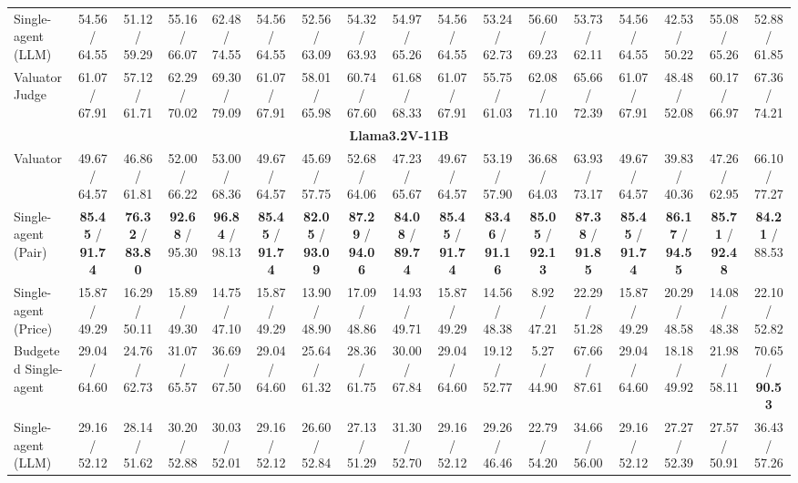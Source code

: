 \begin{table}[!t]
{\begin{tabular}{lcccccccccccccccc}
Single-agent (LLM)           & 54.56 / 64.55 & 51.12 / 59.29 & 55.16 / 66.07 & 62.48 / 74.55 & 54.56 / 64.55 & 52.56 / 63.09 & 54.32 / 63.93 & 54.97 / 65.26 & 54.56 / 64.55 & 53.24 / 62.73 & 56.60 / 69.23 & 53.73 / 62.11 & 54.56 / 64.55 & 42.53 / 50.22 & 55.08 / 65.26 & 52.88 / 61.85 \\
Valuator Judge               & 61.07 / 67.91 & 57.12 / 61.71 & 62.29 / 70.02 & 69.30 / 79.09 & 61.07 / 67.91 & 58.01 / 65.98 & 60.74 / 67.60 & 61.68 / 68.33 & 61.07 / 67.91 & 55.75 / 61.03 & 62.08 / 71.10 & 65.66 / 72.39 & 61.07 / 67.91 & 48.48 / 52.08 & 60.17 / 66.97 & 67.36 / 74.21 \\
\midrule
\multicolumn{17}{c}{\textbf{Llama3.2V-11B}} \\
\midrule
Valuator                     & 49.67 / 64.57 & 46.86 / 61.81 & 52.00 / 66.22 & 53.00 / 68.36 & 49.67 / 64.57 & 45.69 / 57.75 & 52.68 / 64.06 & 47.23 / 65.67 & 49.67 / 64.57 & 53.19 / 57.90 & 36.68 / 64.03 & 63.93 / 73.17 & 49.67 / 64.57 & 39.83 / 40.36 & 47.26 / 62.95 & 66.10 / 77.27 \\
Single-agent (Pair)          & \textbf{85.45} / \textbf{91.74} & \textbf{76.32} / \textbf{83.80} & \textbf{92.68} / 95.30 & \textbf{96.84} / 98.13 & \textbf{85.45} / \textbf{91.74} & \textbf{82.05} / \textbf{93.09} & \textbf{87.29} / \textbf{94.06} & \textbf{84.08} / \textbf{89.74} & \textbf{85.45} / \textbf{91.74} & \textbf{83.46} / \textbf{91.16} & \textbf{85.05} / \textbf{92.13} & \textbf{87.38} / \textbf{91.85} & \textbf{85.45} / \textbf{91.74} & \textbf{86.17} / \textbf{94.55} & \textbf{85.71} / \textbf{92.48} & \textbf{84.21} / 88.53 \\
Single-agent (Price)         & 15.87 / 49.29 & 16.29 / 50.11 & 15.89 / 49.30 & 14.75 / 47.10 & 15.87 / 49.29 & 13.90 / 48.90 & 17.09 / 48.86 & 14.93 / 49.71 & 15.87 / 49.29 & 14.56 / 48.38 & 8.92 / 47.21 & 22.29 / 51.28 & 15.87 / 49.29 & 20.29 / 48.58 & 14.08 / 48.38 & 22.10 / 52.82 \\
Budgeted Single-agent        & 29.04 / 64.60 & 24.76 / 62.73 & 31.07 / 65.57 & 36.69 / 67.50 & 29.04 / 64.60 & 25.64 / 61.32 & 28.36 / 61.75 & 30.00 / 67.84 & 29.04 / 64.60 & 19.12 / 52.77 & 5.27 / 44.90 & 67.66 / 87.61 & 29.04 / 64.60 & 18.18 / 49.92 & 21.98 / 58.11 & 70.65 / \textbf{90.53} \\
Single-agent (LLM)           & 29.16 / 52.12 & 28.14 / 51.62 & 30.20 / 52.88 & 30.03 / 52.01 & 29.16 / 52.12 & 26.60 / 52.84 & 27.13 / 51.29 & 31.30 / 52.70 & 29.16 / 52.12 & 29.26 / 46.46 & 22.79 / 54.20 & 34.66 / 56.00 & 29.16 / 52.12 & 27.27 / 52.39 & 27.57 / 50.91 & 36.43 / 57.26 \\

\end{tabular}}
\end{table}
